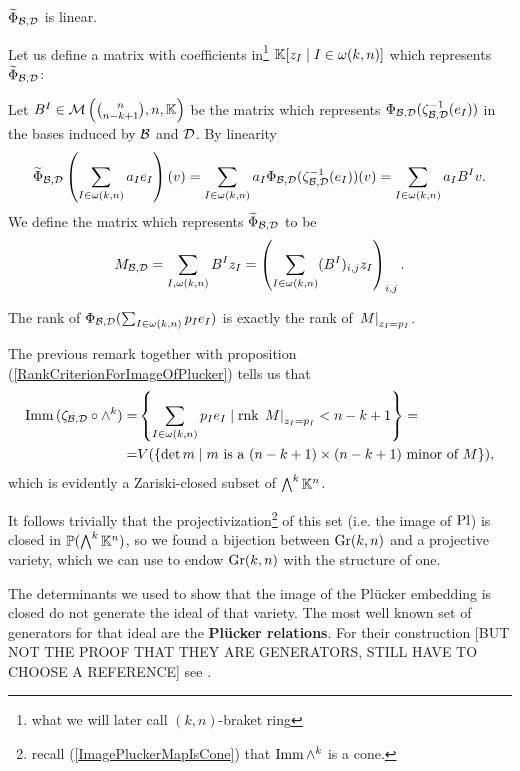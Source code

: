 \begin{remark}
$\widetilde{\Phi}_{\mathcal{B},\mathcal{D}}$ is linear.
\end{remark}



\noindent
Let us define a matrix with coefficients in\footnote{what we will later call $(k,n)$-braket ring} $\mathbb{K}[z_I\mid I\in\omega(k,n)]$ which represents $\widetilde{\Phi}_{\mathcal{B},\mathcal{D}}$:\medskip

\noindent Let $B^I\in \mathcal{M}\left({\binom{n}{n-k+1},n,\mathbb{K}}\right)$ be the matrix which represents $\Phi_{\mathcal{B},\mathcal{D}}(\zeta_{\mathcal{B},\mathcal{D}}^{-1}(e_I))$ in the bases induced by $\mathcal{B}$ and $\mathcal{D}$. By linearity
\[\widetilde{\Phi}_{\mathcal{B},\mathcal{D}}\left({\sum_{I\in \omega(k,n)}a_I e_I}\right)(v)=\sum_{I\in \omega(k,n)}a_I \Phi_{\mathcal{B},\mathcal{D}}(\zeta_{\mathcal{B},\mathcal{D}}^{-1}(e_I))(v)=\sum_{I\in \omega(k,n)}a_I B^I v.\]
We define the matrix which represents $\widetilde{\Phi}_{\mathcal{B},\mathcal{D}}$ to be
\[M_{\mathcal{B},\mathcal{D}}=\sum_{I,\omega(k,n)}B^I z_I=\left({\sum_{I\in\omega(k,n)}(B^I)_{i,j}z_I}\right)_{i,j}.\]


\begin{remark}
The rank of $\Phi_{\mathcal{B},\mathcal{D}}(\sum_{I\in\omega(k,n)}p_Ie_I)$ is exactly the rank of $\left.{M}\right|_{z_I=p_I}$.
\end{remark}

\noindent The previous remark together with proposition (\ref{RankCriterionForImageOfPlucker}) tells us that
\begin{align*}
\mathrm{Imm}\, (\zeta_{\mathcal{B},\mathcal{D}}\circ \wedge^k)=&\left\{{\sum_{I\in \omega(k,n)}p_Ie_I\mid \mathrm{rnk}\, \left.{M}\right|_{z_I=p_I}<n-k+1}\right\}=\\
=&V(\left\{{\det m\mid m\text{ is a $(n-k+1)\times(n-k+1)$ minor of $M$}}\right\}),
\end{align*}
which is evidently a Zariski-closed subset of $\bigwedge^k\mathbb{K}^n$.\smallskip

\noindent
It follows trivially that the projectivization\footnote{recall (\ref{ImagePluckerMapIsCone}) that $\mathrm{Imm}\, \wedge^k$ is a cone.} of this set (i.e. the image of $\mathrm{Pl}$) is closed in $\mathbb{P}(\bigwedge^k\mathbb{K}^n)$, so we found a bijection between $\mathrm{Gr}(k,n)$ and a projective variety, which we can use to endow $\mathrm{Gr}(k,n)$ with the structure of one.


\begin{remark}
The determinants we used to show that the image of the Pl\"ucker embedding is closed do not generate the ideal of that variety. The most well known set of generators for that ideal are the \textbf{Pl\"ucker relations}. For their construction [BUT NOT THE PROOF THAT THEY ARE GENERATORS, STILL HAVE TO CHOOSE A REFERENCE] see \cite{McKernan}.
\end{remark}











